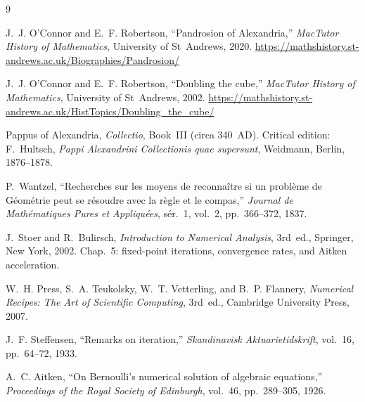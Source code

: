 \documentclass[11pt,a4paper]{article}
\theoremstyle{definition}
\begin{document}
\begin{thebibliography}{9}

J.~J. O'Connor and E.~F. Robertson,
``Pandrosion of Alexandria,''
\textit{MacTutor History of Mathematics}, University of St~Andrews, 2020.
\url{https://mathshistory.st-andrews.ac.uk/Biographies/Pandrosion/}

J.~J. O'Connor and E.~F. Robertson,
``Doubling the cube,''
\textit{MacTutor History of Mathematics}, University of St~Andrews, 2002.
\url{https://mathshistory.st-andrews.ac.uk/HistTopics/Doubling_the_cube/}

Pappus of Alexandria,
\textit{Collectio}, Book~III (circa 340~AD).
Critical edition: F.~Hultsch, \textit{Pappi Alexandrini Collectionis quae supersunt},
Weidmann, Berlin, 1876--1878.

P.~Wantzel,
``Recherches sur les moyens de reconna\^itre si un probl\`eme de G\'eom\'etrie peut se r\'esoudre avec la r\`egle et le compas,''
\textit{Journal de Math\'ematiques Pures et Appliqu\'ees}, s\'er.~1, vol.~2, pp.~366--372, 1837.

J.~Stoer and R.~Bulirsch,
\textit{Introduction to Numerical Analysis},
3rd~ed., Springer, New York, 2002.
Chap.~5: fixed-point iterations, convergence rates, and Aitken acceleration.

W.~H. Press, S.~A. Teukolsky, W.~T. Vetterling, and B.~P. Flannery,
\textit{Numerical Recipes: The Art of Scientific Computing},
3rd~ed., Cambridge University Press, 2007.

J.~F. Steffensen,
``Remarks on iteration,''
\textit{Skandinavisk Aktuarietidskrift}, vol.~16, pp.~64--72, 1933.

A.~C. Aitken,
``On Bernoulli's numerical solution of algebraic equations,''
\textit{Proceedings of the Royal Society of Edinburgh}, vol.~46, pp.~289--305, 1926.

\end{thebibliography}
\end{document}
